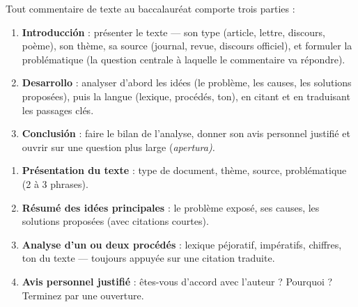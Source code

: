 \documentclass[11pt]{article}
\newcommand{\cle}[1]{{\popxbold\color{popdark}#1}}
\newcommand{\esp}[1]{\ifmmode\text{\textit{#1}}\else\begingroup\selectlanguage{spanish}\itshape #1\endgroup\fi}
\begin{document}
\begin{propriete}
Tout commentaire de texte au baccalauréat comporte trois parties :
\begin{enumerate}
\item \textbf{Introducción} : présenter le texte — son \cle{type} (article, lettre, discours, poème), son \cle{thème}, sa \cle{source} (journal, revue, discours officiel), et formuler la \cle{problématique} (la question centrale à laquelle le commentaire va répondre).
\item \textbf{Desarrollo} : analyser d'abord les \cle{idées} (le problème, les causes, les solutions proposées), puis la \cle{langue} (lexique, procédés, ton), en citant et en traduisant les passages clés.
\item \textbf{Conclusión} : faire le \cle{bilan} de l'analyse, donner son avis personnel justifié et ouvrir sur une question plus large (\esp{apertura}).
\end{enumerate}
\end{propriete}

\begin{methode}
\begin{enumerate}
\item \textbf{Présentation du texte} : type de document, thème, source, problématique (2 à 3 phrases).
\item \textbf{Résumé des idées principales} : le problème exposé, ses causes, les solutions proposées (avec citations courtes).
\item \textbf{Analyse d'un ou deux procédés} : lexique péjoratif, impératifs, chiffres, ton du texte — toujours appuyée sur une citation traduite.
\item \textbf{Avis personnel justifié} : êtes-vous d'accord avec l'auteur ? Pourquoi ? Terminez par une ouverture.
\end{enumerate}
\end{methode}
\end{document}
